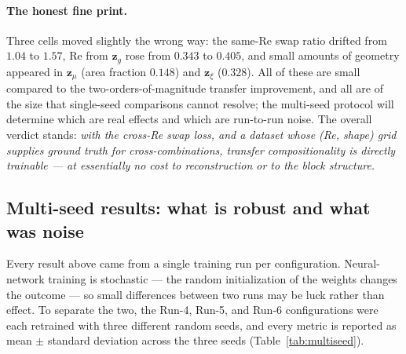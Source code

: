 \documentclass[11pt]{article}
\begin{document}
\paragraph{The honest fine print.} Three cells moved slightly the wrong
way: the same-Re swap ratio drifted from $1.04$ to $1.57$, Re from
$\boldsymbol{z}_{g}$ rose from $0.343$ to $0.405$, and small amounts of
geometry appeared in $\boldsymbol{z}_{\mu}$ (area fraction $0.148$) and
$\boldsymbol{z}_{\xi}$ ($0.328$). All of these are small compared to the
two-orders-of-magnitude transfer improvement, and all are of the size
that single-seed comparisons cannot resolve; the multi-seed protocol
will determine which are real effects and which are run-to-run noise.
The overall verdict stands: \emph{with the cross-Re swap loss, and a
dataset whose (Re, shape) grid supplies ground truth for
cross-combinations, transfer compositionality is directly trainable ---
at essentially no cost to reconstruction or to the block structure.}

\subsection{Multi-seed results: what is robust and what was noise}

Every result above came from a single training run per configuration.
Neural-network training is stochastic --- the random initialization of
the weights changes the outcome --- so small differences between two
runs may be luck rather than effect. To separate the two, the Run-4,
Run-5, and Run-6 configurations were each retrained with three different
random seeds, and every metric is reported as mean $\pm$ standard
deviation across the three seeds (Table~\ref{tab:multiseed}).
\end{document}
